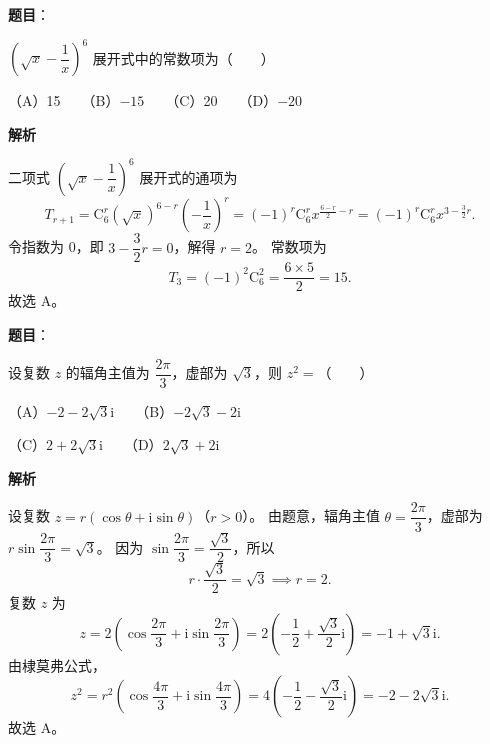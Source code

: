 \begin{answer}

\textbf{题目}：

$\left(\sqrt{x}-\dfrac{1}{x}\right)^6$ 展开式中的常数项为\mbox{（　　）}

（A）15　　（B）$-15$　　（C）20　　（D）$-20$

\textbf{解析}

二项式 $\left(\sqrt{x}-\dfrac{1}{x}\right)^6$ 展开式的通项为
\nopagebreak[4]
\[
T_{r+1}=\mathrm{C}_6^r (\sqrt{x})^{6-r}\left(-\frac{1}{x}\right)^r=(-1)^r \mathrm{C}_6^r x^{\frac{6-r}{2}-r}=(-1)^r \mathrm{C}_6^r x^{3-\frac{3}{2}r}.
\]
令指数为 0，即 $3-\dfrac{3}{2}r=0$，解得 $r=2$。
常数项为
\nopagebreak[4]
\[
T_3=(-1)^2 \mathrm{C}_6^2=\frac{6\times 5}{2}=15.
\]
故选 A。


\end{answer}
\begin{answer}

\textbf{题目}：

设复数 $z$ 的辐角主值为 $\dfrac{2\pi}{3}$，虚部为 $\sqrt{3}$，则 $z^2=$\mbox{（　　）}

（A）$-2-2\sqrt{3}\mathrm{i}$　　（B）$-2\sqrt{3}-2\mathrm{i}$

（C）$2+2\sqrt{3}\mathrm{i}$　　（D）$2\sqrt{3}+2\mathrm{i}$

\textbf{解析}

设复数 $z=r(\cos\theta+\mathrm{i}\sin\theta)$（$r>0$）。
由题意，辐角主值 $\theta=\dfrac{2\pi}{3}$，虚部为 $r\sin\dfrac{2\pi}{3}=\sqrt{3}$。
因为 $\sin\dfrac{2\pi}{3}=\dfrac{\sqrt{3}}{2}$，所以
\nopagebreak[4]
\[
r\cdot\frac{\sqrt{3}}{2}=\sqrt{3} \implies r=2.
\]
复数 $z$ 为
\nopagebreak[4]
\[
z=2\left(\cos\frac{2\pi}{3}+\mathrm{i}\sin\frac{2\pi}{3}\right)=2\left(-\frac{1}{2}+\frac{\sqrt{3}}{2}\mathrm{i}\right)=-1+\sqrt{3}\mathrm{i}.
\]
由棣莫弗公式，
\nopagebreak[4]
\[
z^2=r^2\left(\cos\frac{4\pi}{3}+\mathrm{i}\sin\frac{4\pi}{3}\right)=4\left(-\frac{1}{2}-\frac{\sqrt{3}}{2}\mathrm{i}\right)=-2-2\sqrt{3}\mathrm{i}.
\]
故选 A。


\end{answer}
